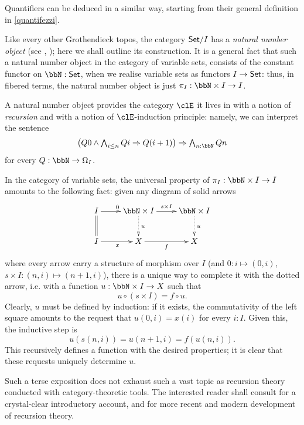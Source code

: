 Quantifiers can be deduced in a similar way, starting from their general definition in \autoref{quantifezzi}.
\begin{remark}
	Like every other Grothendieck topos, the category $\mathsf{Set}/I$ has a \emph{natural number object} (see \cite[VI.1]{mac1992sheaves}, \cite[p.46]{lambek1988introduction}); here we shall outline its construction. It is a general fact that such a natural number object in the category of variable sets, consists of the constant functor on $\bbN : \Set$, when we realise variable sets as functors $I \to \mathsf{Set}$: thus, in fibered terms, the natural number object is just $\pi_I : \bbN \times I \to I$.

	A natural number object provides the category $\clE$ it lives in with a notion of \emph{recursion} and with a notion of $\clE$-induction principle: namely, we can interpret the sentence
	\[\textstyle\big(Q0\land \bigwedge_{i\le n} Qi\Rightarrow Q(i+1)\big)\Rightarrow \bigwedge_{n : \bbN} Qn\]
	for every $Q : \bbN \to \Omega_I$.

	In the category of variable sets, the universal property of $\pi_I : \bbN\times I \to I$ amounts to the following fact: given any diagram of solid arrows
	\begin{equation}\label{natnumeq}
		\vcenter{\xymatrix{
				I \ar[r]^0 \ar@{=}[d] & \bbN\times I\ar@{.>}[d]^u \ar[r]^{s\times I} & \bbN \times I\ar@{.>}[d]^u \\
				I \ar[r]_x & X \ar[r]_f & X
			}}
	\end{equation}
	where every arrow carry a structure of morphism over $I$ (and $0 : i \mapsto (0,i)$, $s\times I : (n,i) \mapsto (n+1,i)$), there is a unique way to complete it with the dotted arrow, i.e. with a function $u : \bbN \times I \to X$ such that
	\[u \circ (s\times I) = f \circ u.\]
	Clearly, $u$ must be defined by induction: if it exists, the commutativity of the left square amounts to the request that $u(0,i)=x(i)$ for every $i : I$. Given this, the inductive step is
	\[
		u(s(n,i)) = u(n+1,i) = f(u(n,i)).
	\]
	This recursively defines a function with the desired properties; it is clear that these requests uniquely determine $u$.
\end{remark}
Such a terse exposition does not exhaust such a vast topic as recursion theory conducted with category-theoretic tools. The interested reader shall consult \cite{jacobs1997tutorial} for a crystal-clear introductory account, and \cite{cockett2008introduction,cockett2014total} for more recent and modern development of recursion theory.
